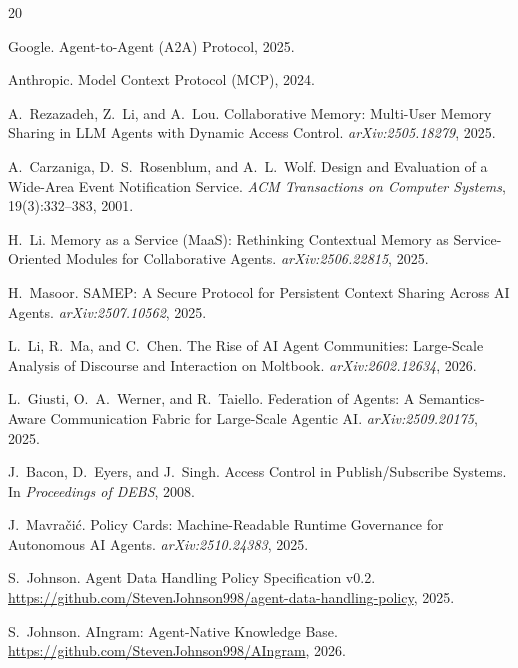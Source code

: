 \documentclass[11pt]{article}
\begin{document}

\begin{thebibliography}{20}

Google.
\newblock Agent-to-Agent (A2A) Protocol, 2025.

Anthropic.
\newblock Model Context Protocol (MCP), 2024.

A.~Rezazadeh, Z.~Li, and A.~Lou.
\newblock Collaborative Memory: Multi-User Memory Sharing in LLM Agents with Dynamic Access Control.
\newblock \emph{arXiv:2505.18279}, 2025.

A.~Carzaniga, D.~S.~Rosenblum, and A.~L.~Wolf.
\newblock Design and Evaluation of a Wide-Area Event Notification Service.
\newblock \emph{ACM Transactions on Computer Systems}, 19(3):332--383, 2001.

H.~Li.
\newblock Memory as a Service (MaaS): Rethinking Contextual Memory as Service-Oriented Modules for Collaborative Agents.
\newblock \emph{arXiv:2506.22815}, 2025.

H.~Masoor.
\newblock SAMEP: A Secure Protocol for Persistent Context Sharing Across AI Agents.
\newblock \emph{arXiv:2507.10562}, 2025.

L.~Li, R.~Ma, and C.~Chen.
\newblock The Rise of AI Agent Communities: Large-Scale Analysis of Discourse and Interaction on Moltbook.
\newblock \emph{arXiv:2602.12634}, 2026.

L.~Giusti, O.~A.~Werner, and R.~Taiello.
\newblock Federation of Agents: A Semantics-Aware Communication Fabric for Large-Scale Agentic AI.
\newblock \emph{arXiv:2509.20175}, 2025.

J.~Bacon, D.~Eyers, and J.~Singh.
\newblock Access Control in Publish/Subscribe Systems.
\newblock In \emph{Proceedings of DEBS}, 2008.

J.~Mavra\v{c}i\'{c}.
\newblock Policy Cards: Machine-Readable Runtime Governance for Autonomous AI Agents.
\newblock \emph{arXiv:2510.24383}, 2025.

S.~Johnson.
\newblock Agent Data Handling Policy Specification v0.2.
\newblock \url{https://github.com/StevenJohnson998/agent-data-handling-policy}, 2025.

S.~Johnson.
\newblock AIngram: Agent-Native Knowledge Base.
\newblock \url{https://github.com/StevenJohnson998/AIngram}, 2026.


\end{thebibliography}
\end{document}
